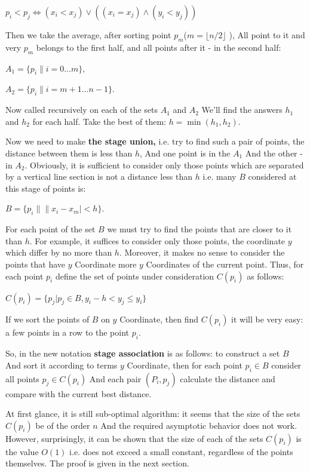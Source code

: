 $p_{i}<p_{j}\Leftrightarrow(x_{i}<x_{j})\vee\left((x_{i}=x_{j})\wedge(y_{i}<y_{j})\right)$

Then we take the average, after sorting point $p_m$($m = \lfloor n / 2 \rfloor$ ), All point to it and very $p_m$ belongs to the first half, and all points after it - in the second half:

$A_1 = \{p_i \| i = 0 \ldots m \},$

$A_2 = \{p_i \| i = m +1 \ldots n-1 \}.$

Now called recursively on each of the sets $A_1$ and $A_2$ We'll find the answers $h_1$ and $h_2$ for each half. Take the best of them: $h = \min (h_1, h_2)$.

Now we need to make \textbf{the stage union,} i.e. try to find such a pair of points, the distance between them is less than $h$, And one point is in the $A_1$ And the other - in $A_2$. Obviously, it is sufficient to consider only those points which are separated by a vertical line section is not a distance less than $h$ i.e. many $B$ considered at this stage of points is:

$B = \{p_i \| \| x_i - x_m | <h \}.$

For each point of the set $B$ we must try to find the points that are closer to it than $h$. For example, it suffices to consider only those points, the coordinate $y$ which differ by no more than $h$. Moreover, it makes no sense to consider the points that have $y$ Coordinate more $y$ Coordinates of the current point. Thus, for each point $p_i$ define the set of points under consideration $C (p_i)$ as follows:

$C(p_{i})=\{p_{j}|p_{j}\in B,y_{i}-h<y_{j}\leq y_{i}\}$

If we sort the points of $B$ on $y$ Coordinate, then find $C (p_i)$ it will be very easy: a few points in a row to the point $p_i$.

So, in the new notation \textbf{stage association} is as follows: to construct a set $B$ And sort it according to terms $y$ Coordinate, then for each point $p_i \in B$ consider all points $p_j \in C (p_i)$ And each pair $(P_i, p_j)$ calculate the distance and compare with the current best distance.

At first glance, it is still sub-optimal algorithm: it seems that the size of the sets $C (p_i)$ be of the order $n$ And the required asymptotic behavior does not work. However, surprisingly, it can be shown that the size of each of the sets $C (p_i)$ is the value $O (1)$ i.e. does not exceed a small constant, regardless of the points themselves. The proof is given in the next section.

